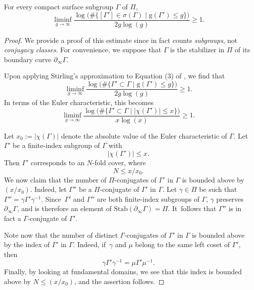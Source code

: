 \begin{lemma}\label{l.Muller_Puchta}
For every compact surface subgroup $\Gamma$ of $\Pi$,
\begin{equation}\label{eq.lower_bound_MP}
\liminf_{g\to\infty}\frac{\log\bigl(\#\{[\Gamma']\in\sigma(\Gamma)\mid \mathrm{g}(\Gamma')\leq g\}\bigr)}{2g\log(g)} \geq 1.
\end{equation}
\end{lemma}

\begin{proof}
We provide a proof of this estimate since \cite{Muller_Puchta} in fact counts \emph{subgroups}, not \emph{conjugacy classes}. For convenience, we suppose that $\Gamma$ is the stabilizer in $\Pi$ of its boundary curve $\partial_\infty\Gamma$.

Upon applying Stirling's approximation to Equation (3) of \cite{Muller_Puchta}, we find that
\begin{equation*}
\liminf_{g\to\infty}\frac{\log\bigl(\#\{\Gamma'\subset\Gamma\mid \mathrm{g}(\Gamma')\leq g\}\bigr)}{2g\log(g)} \geq 1.
\end{equation*}
In terms of the Euler characteristic, this becomes
\begin{equation*}
\liminf_{g\to\infty}\frac{\log\bigl(\#\{\Gamma'\subset\Gamma\mid \left|\chi(\Gamma')\right|\leq x\}\bigr)}{x\log(x)} \geq 1.
\end{equation*}

Let $x_0:=\left|\chi(\Gamma)\right|$ denote the absolute value of the Euler characteristic of $\Gamma$. Let $\Gamma'$ be a finite-index subgroup of $\Gamma$ with
\begin{equation*}
\left|\chi(\Gamma')\right| \leq x.
\end{equation*}
Then $\Gamma'$ corresponds to an $N$-fold cover, where
\begin{equation*}
N\leq x/x_0.
\end{equation*}
We now claim that the number of $\Pi$-conjugates of $\Gamma'$ in $\Gamma$ is bounded above by $(x/x_0)$. Indeed, let $\Gamma''$ be a $\Pi$-conjugate of $\Gamma'$ in $\Gamma$. Let $\gamma\in\Pi$ be such that $\Gamma''=\gamma\Gamma'\gamma^{-1}$. Since~$\Gamma'$ and $\Gamma''$ are both finite-index subgroups of $\Gamma$, $\gamma$ preserves $\partial_\infty\Gamma$, and is therefore an element of $\mathrm{Stab}(\partial_\infty\Gamma)=\Pi$. It~follows that $\Gamma''$ is in fact a $\Gamma$-conjugate of $\Gamma'$.

Note now that the number of distinct $\Gamma$-conjugates of $\Gamma'$ in $\Gamma$ is bounded above by the index of $\Gamma'$ in $\Gamma$. Indeed, if~$\gamma$ and $\mu$ belong to the same left coset of $\Gamma'$, then
\begin{equation*}
\gamma\Gamma'\gamma^{-1} = \mu\Gamma'\mu^{-1}.
\end{equation*}
Finally, by looking at fundamental domains, we see that this index is bounded above by $N\leq (x/x_0)$, and the assertion follows.


\end{proof}
